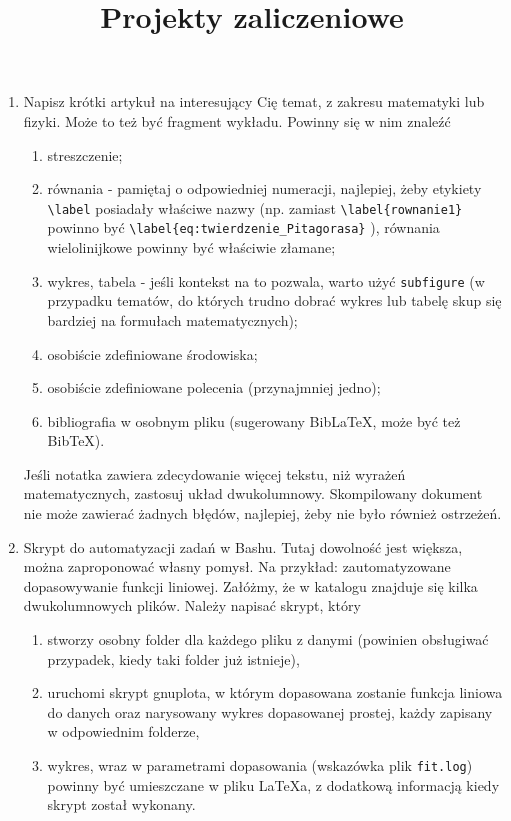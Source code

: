 \documentclass[12pt, letterpaper]{article}
\title{Projekty zaliczeniowe}
\date{}
\begin{document}
\maketitle
\begin{enumerate}
    \item Napisz krótki artykuł na interesujący Cię temat, z zakresu matematyki lub fizyki. Może to też być fragment wykładu. Powinny się w nim znaleźć
    \begin{enumerate}
        \item streszczenie;
        \item równania - pamiętaj o odpowiedniej numeracji, najlepiej, żeby etykiety \verb|\label| posiadały właściwe nazwy (np. zamiast \verb|\label{rownanie1}| powinno być \verb|\label{eq:twierdzenie_Pitagorasa}| ), równania wielolinijkowe powinny być właściwie złamane;
        \item wykres, tabela - jeśli kontekst na to pozwala, warto użyć \verb|subfigure| (w przypadku tematów, do których trudno dobrać wykres lub tabelę skup się bardziej na formułach matematycznych);
        \item osobiście zdefiniowane środowiska;
        \item osobiście zdefiniowane polecenia (przynajmniej jedno);
        \item bibliografia w osobnym pliku (sugerowany BibLaTeX, może być też BibTeX).
    \end{enumerate}
    Jeśli notatka zawiera zdecydowanie więcej tekstu, niż wyrażeń matematycznych, zastosuj układ dwukolumnowy. Skompilowany dokument nie może zawierać żadnych błędów, najlepiej, żeby nie było również ostrzeżeń.
    \item Skrypt do automatyzacji zadań w Bashu. Tutaj dowolność jest większa, można zaproponować własny pomysł. Na przykład: zautomatyzowane dopasowywanie funkcji liniowej. Załóżmy, że w katalogu znajduje się kilka dwukolumnowych plików. Należy napisać skrypt, który
    \begin{enumerate}
        \item stworzy osobny folder dla każdego pliku z danymi (powinien obsługiwać przypadek, kiedy taki folder już istnieje),
        \item uruchomi skrypt gnuplota, w którym dopasowana zostanie funkcja liniowa do danych oraz narysowany wykres dopasowanej prostej, każdy zapisany w odpowiednim folderze,
        \item wykres, wraz w parametrami dopasowania (wskazówka plik \verb|fit.log|) powinny być umieszczane w pliku \LaTeX{a}, z dodatkową informacją kiedy skrypt został wykonany.
    \end{enumerate}
\end{enumerate}
\end{document}
